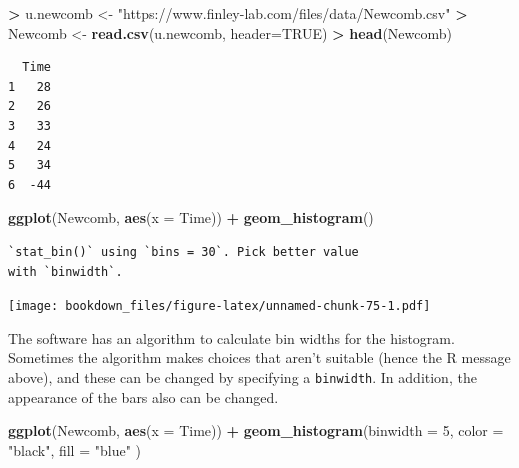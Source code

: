 \documentclass[
]{krantz}
\makeatletter
\newenvironment{Shaded}{\begin{snugshade}}{\end{snugshade}}
\newcommand{\DataTypeTok}[1]{\textcolor[rgb]{0.27,0.27,0.27}{#1}}
\newcommand{\DecValTok}[1]{\textcolor[rgb]{0.06,0.06,0.06}{#1}}
\newcommand{\KeywordTok}[1]{\textcolor[rgb]{0.27,0.27,0.27}{\textbf{#1}}}
\newcommand{\NormalTok}[1]{#1}
\newcommand{\OperatorTok}[1]{\textcolor[rgb]{0.43,0.43,0.43}{\textbf{#1}}}
\newcommand{\OtherTok}[1]{\textcolor[rgb]{0.37,0.37,0.37}{#1}}
\newcommand{\StringTok}[1]{\textcolor[rgb]{0.5,0.5,0.5}{#1}}
\newenvironment{kframe}{%
\medskip{}
\setlength{\fboxsep}{.8em}
 \def\at@end@of@kframe{}%
 \ifinner\ifhmode%
  \def\at@end@of@kframe{\end{minipage}}%
  \begin{minipage}{\columnwidth}%
 \fi\fi%
 \def\FrameCommand##1{\hskip\@totalleftmargin \hskip-\fboxsep
 \colorbox{shadecolor}{##1}\hskip-\fboxsep
     \hskip-\linewidth \hskip-\@totalleftmargin \hskip\columnwidth}%
 \MakeFramed {\advance\hsize-\width
   \@totalleftmargin\z@ \linewidth\hsize
   \@setminipage}}%
 {\par\unskip\endMakeFramed%
 \at@end@of@kframe}
\renewenvironment{Shaded}{\begin{kframe}}{\end{kframe}}
\makeatother
\begin{document}
\begin{Shaded}
\begin{Highlighting}[]
\OperatorTok{\textgreater{}}\StringTok{ }\NormalTok{u.newcomb \textless{}{-}}\StringTok{ "https://www.finley{-}lab.com/files/data/Newcomb.csv"}
\OperatorTok{\textgreater{}}\StringTok{ }\NormalTok{Newcomb \textless{}{-}}\StringTok{ }\KeywordTok{read.csv}\NormalTok{(u.newcomb, }\DataTypeTok{header=}\OtherTok{TRUE}\NormalTok{)}
\OperatorTok{\textgreater{}}\StringTok{ }\KeywordTok{head}\NormalTok{(Newcomb)}
\end{Highlighting}
\end{Shaded}

\begin{verbatim}
  Time
1   28
2   26
3   33
4   24
5   34
6  -44
\end{verbatim}

\begin{Shaded}
\begin{Highlighting}[]
\KeywordTok{ggplot}\NormalTok{(Newcomb, }\KeywordTok{aes}\NormalTok{(}\DataTypeTok{x =}\NormalTok{ Time)) }\OperatorTok{+}\StringTok{ }\KeywordTok{geom\_histogram}\NormalTok{()}
\end{Highlighting}
\end{Shaded}

\begin{verbatim}
`stat_bin()` using `bins = 30`. Pick better value
with `binwidth`.
\end{verbatim}

\texttt{[image: bookdown\_files/figure-latex/unnamed-chunk-75-1.pdf]}

The software has an algorithm to calculate bin widths for the histogram. Sometimes the algorithm makes choices that aren't suitable (hence the R message above), and these can be changed by specifying a \texttt{binwidth}. In addition, the appearance of the bars also can be changed.

\begin{Shaded}
\begin{Highlighting}[]
\KeywordTok{ggplot}\NormalTok{(Newcomb, }\KeywordTok{aes}\NormalTok{(}\DataTypeTok{x =}\NormalTok{ Time)) }\OperatorTok{+}\StringTok{ }
\StringTok{    }\KeywordTok{geom\_histogram}\NormalTok{(}\DataTypeTok{binwidth =} \DecValTok{5}\NormalTok{, }\DataTypeTok{color =} \StringTok{"black"}\NormalTok{, }\DataTypeTok{fill =} \StringTok{"blue"}\NormalTok{ )}
\end{Highlighting}
\end{Shaded}
\end{document}
